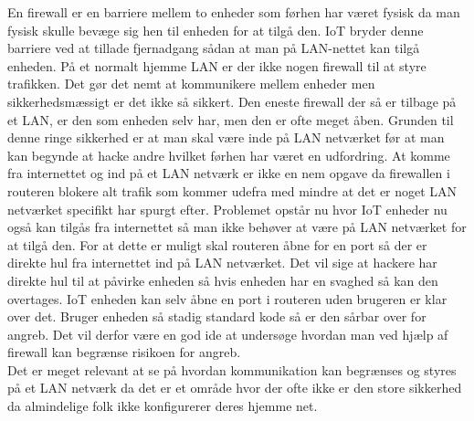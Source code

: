     En firewall er en barriere mellem to enheder som førhen har været fysisk da man fysisk skulle bevæge sig hen til enheden for at tilgå den. IoT bryder denne barriere ved at tillade fjernadgang sådan at man på LAN-nettet kan tilgå enheden. På et normalt hjemme LAN er der ikke nogen firewall til at styre trafikken. Det gør det nemt at kommunikere mellem enheder men sikkerhedsmæssigt er det ikke så sikkert. Den eneste firewall der så er tilbage på et LAN, er den som enheden selv har, men den er ofte meget åben. Grunden til denne ringe sikkerhed er at man skal være inde på LAN netværket før at man kan begynde at hacke andre hvilket førhen har været en udfordring. At komme fra internettet og ind på et LAN netværk er ikke en nem opgave da firewallen i routeren blokere alt trafik som kommer udefra med mindre at det er noget LAN netværket specifikt har spurgt efter. Problemet opstår nu hvor IoT enheder nu også kan tilgås fra internettet så man ikke behøver at være på LAN netværket for at tilgå den. For at dette er muligt skal routeren åbne for en port så der er direkte hul fra internettet ind på LAN netværket. Det vil sige at hackere har direkte hul til at påvirke enheden så hvis enheden har en svaghed så kan den overtages. IoT enheden kan selv åbne en port i routeren uden brugeren er klar over det. Bruger enheden så stadig standard kode så er den sårbar over for angreb. Det vil derfor være en god ide at undersøge hvordan man ved hjælp af firewall kan begrænse risikoen for angreb.\\
    Det er meget relevant at se på hvordan kommunikation kan begrænses og styres på et LAN netværk da det er et område hvor der ofte ikke er den store sikkerhed da almindelige folk ikke konfigurerer deres hjemme net.
    
    
   
       
